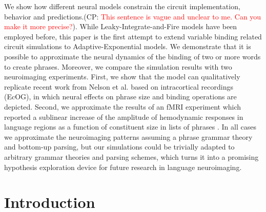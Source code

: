 \documentclass[10pt]{article}
\newcommand{\noteCP}[1]{(CP: \textcolor{red}{#1})}
\begin{document}
We show how different neural models constrain the circuit
implementation, behavior and predictions.\noteCP{This sentence is vague and unclear to me. Can you make it more precise?}. While Leaky-Integrate-and-Fire
models have been employed before, this paper is the first
attempt to extend variable binding related circuit simulations to
Adaptive-Exponential models. We demonstrate that it is possible to
approximate the neural dynamics of the binding of two or more words to
create phrases. Moreover, we compare the simulation results with two
neuroimaging experiments. First, we show that the model can
qualitatively replicate recent work from Nelson et al.
\cite{Nelson2017} based on intracortical recordings (EcOG), in which
neural effects on phrase size and binding operations are depicted.
Second, we approximate the results of an fMRI experiment which reported
a sublinear increase of the amplitude of hemodynamic responses in
language regions as a function of constituent size in lists of phrases
\cite{Pallier2011}. In all cases we approximate the neuroimaging
patterns assuming a phrase grammar theory and bottom-up parsing, but our
simulations could be trivially adapted to arbitrary grammar theories and
parsing schemes, which turns it into a promising hypothesis exploration
device for future research in language neuroimaging.



\section{Introduction}

{\label{931947}}
\end{document}
